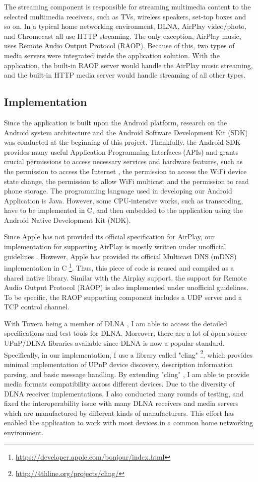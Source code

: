 The streaming component is responsible for streaming multimedia content to the
selected multimedia receivers, such as TVs, wireless speakers, set-top boxes
and so on. In a typical home networking environment, DLNA, AirPlay video/photo,
and Chromecast all use HTTP streaming. The only exception, AirPlay music, uses
Remote Audio Output Protocol (RAOP). Because of this, two types of media
servers were integrated inside the application solution. With the application,
the built-in RAOP server would handle the AirPlay music streaming, and the
built-in HTTP media server would handle streaming of all other types.

\subsection{Implementation\label{3_2}}
Since the application is built upon the Android platform, research on the
Android system architecture and the Android Software Development Kit (SDK) was
conducted at the beginning of this project. Thankfully, the Android SDK provides
many useful Application Programming Interfaces (APIs) and grants crucial
permissions to access necessary services and hardware features, such as the
permission to access the Internet , the permission to access the WiFi device
state change, the permission to allow WiFi multicast and  the permission to
read phone storage. The programming language used in developing our Android
Application is Java. However, some CPU-intensive works, such as transcoding,
have to be implemented in C, and then embedded to the application using the
Android Native Development Kit (NDK).

Since Apple has not provided its official specification for AirPlay, our
implementation for supporting AirPlay is mostly written under unofficial
guidelines \cite{AirPlay-spec}. However, Apple has provided its official
Multicast DNS (mDNS) implementation in C
\footnote{\url{https://developer.apple.com/bonjour/index.html}}. Thus, this
piece of code is reused and compiled as a shared native library. Similar with
the Airplay support, the support for Remote Audio Output Protocol (RAOP) is
also implemented under unofficial guidelines.
To be specific, the RAOP supporting component includes a UDP server and a TCP
control channel.

With Tuxera being a member of DLNA , I am able to access the detailed
specifications and test tools for DLNA. Moreover, there are a lot of open
source UPnP/DLNA libraries available since DLNA is now a popular standard.
Specifically, in our implementation, I use a library called "cling"
\cite{cling} \footnote{\url{http://4thline.org/projects/cling/}}, which
provides minimal implementation of UPnP device discovery, description
information parsing, and basic message handling. By extending "cling"
\cite{cling}, I am able to provide media formats compatibility across
different devices. Due to the diversity of DLNA receiver implementations, I also
conducted many rounds of testing, and fixed the interoperability issue with
many DLNA receivers and media servers which are manufactured by different kinds
of manufacturers. This effort has enabled the application to work with most
devices in a common home networking environment.

